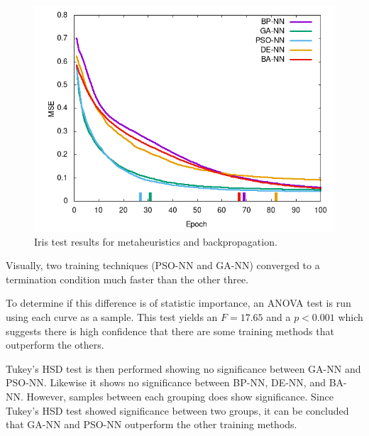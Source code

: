 \documentclass[a4paper,12pt]{article}
\begin{document}
\begin{figure}[h!]
\centering
\includegraphics[scale=0.60]{images/iris-plot.png}
\caption{Iris test results for metaheuristics and backpropagation.}
\label{fig:iris}
\end{figure}

Visually, two training techniques (PSO-NN and GA-NN) converged to a termination condition much faster than the other three.

To determine if this difference is of statistic importance, an ANOVA test is run using each curve as a sample. This test yields an $F = 17.65$ and a $p < 0.001$ which suggests there is high confidence that there are some training methods that outperform the others.

Tukey's HSD test is then performed showing no significance between GA-NN and PSO-NN. Likewise it shows no significance between BP-NN, DE-NN, and BA-NN. However, samples between each grouping does show significance. Since Tukey's HSD test showed significance between two groups, it can be concluded that GA-NN and PSO-NN outperform the other training methods.

\begin{table}[h!]
\centering
{}
\caption{Minimum and average time to terminate for Iris data set.}
\label{Tab:iris-min}
\end{table}
\end{document}
